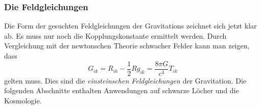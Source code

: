 %
%
\subsubsection{Die Feldgleichungen}
Die Form der gesuchten Feldgleichungen der Gravitations zeichnet sich
jetzt klar ab.
Es muss nur noch die Kopplungskonstante ermittelt werden.
Durch Vergleichung mit der newtonschen Theorie schwacher Felder 
kann man zeigen, dass 
\begin{equation}
G_{ik}
=
R_{ik}
-
\frac12 Rg_{ik}
=
\frac{8\pi G}{c^4}T_{ik}
\label{buch:kruemmung:feldgleichung:eqn:feldgleichung}
\end{equation}
gelten muss.
Dies sind die \emph{einsteinschen Feldgleichungen} der Gravitation.
%
%
Die folgenden Abschnitte enthalten Anwendungen auf schwarze Löcher
und die Kosmologie.

